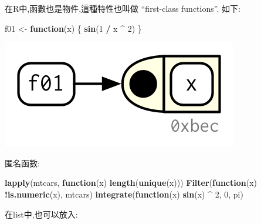 \documentclass[]{book}
\newenvironment{Shaded}{\begin{snugshade}}{\end{snugshade}}
\newcommand{\KeywordTok}[1]{\textcolor[rgb]{0.13,0.29,0.53}{\textbf{#1}}}
\newcommand{\DataTypeTok}[1]{\textcolor[rgb]{0.13,0.29,0.53}{#1}}
\newcommand{\DecValTok}[1]{\textcolor[rgb]{0.00,0.00,0.81}{#1}}
\newcommand{\StringTok}[1]{\textcolor[rgb]{0.31,0.60,0.02}{#1}}
\newcommand{\ControlFlowTok}[1]{\textcolor[rgb]{0.13,0.29,0.53}{\textbf{#1}}}
\newcommand{\OperatorTok}[1]{\textcolor[rgb]{0.81,0.36,0.00}{\textbf{#1}}}
\newcommand{\NormalTok}[1]{#1}
\theoremstyle{definition}
\theoremstyle{definition}
\theoremstyle{definition}
\theoremstyle{remark}
\begin{document}
在R中,函數也是物件,這種特性也叫做 ``first-class functions''. 如下:

\begin{Shaded}
\begin{Highlighting}[]
\NormalTok{f01 <-}\StringTok{ }\ControlFlowTok{function}\NormalTok{(x) \{}
  \KeywordTok{sin}\NormalTok{(}\DecValTok{1} \OperatorTok{/}\StringTok{ }\NormalTok{x }\OperatorTok{^}\StringTok{ }\DecValTok{2}\NormalTok{)}
\NormalTok{\}}
\end{Highlighting}
\end{Shaded}

\begin{center}\includegraphics{diagrams/functions/first-class} \end{center}

匿名函數:

\begin{Shaded}
\begin{Highlighting}[]
\KeywordTok{lapply}\NormalTok{(mtcars, }\ControlFlowTok{function}\NormalTok{(x) }\KeywordTok{length}\NormalTok{(}\KeywordTok{unique}\NormalTok{(x)))}
\KeywordTok{Filter}\NormalTok{(}\ControlFlowTok{function}\NormalTok{(x) }\OperatorTok{!}\KeywordTok{is.numeric}\NormalTok{(x), mtcars)}
\KeywordTok{integrate}\NormalTok{(}\ControlFlowTok{function}\NormalTok{(x) }\KeywordTok{sin}\NormalTok{(x) }\OperatorTok{^}\StringTok{ }\DecValTok{2}\NormalTok{, }\DecValTok{0}\NormalTok{, pi)}
\end{Highlighting}
\end{Shaded}

在list中,也可以放入:

\begin{Shaded}
\end{Shaded}
\end{document}
